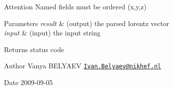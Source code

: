 \begin{DoxyAttention}{Attention}
Named fields must be ordered {\ttfamily (x,y,z)}
\end{DoxyAttention}

\begin{DoxyParams}{Parameters}
{\em result} & (output) the parsed lorentz vector \\
\hline
{\em input} & (input) the input string \\
\hline
\end{DoxyParams}
\begin{DoxyReturn}{Returns}
status code 
\end{DoxyReturn}
\begin{DoxyAuthor}{Author}
Vanya B\+E\+L\+Y\+A\+EV \href{mailto:Ivan.Belyaev@nikhef.nl}{\tt Ivan.\+Belyaev@nikhef.\+nl} 
\end{DoxyAuthor}
\begin{DoxyDate}{Date}
2009-\/09-\/05 
\end{DoxyDate}
